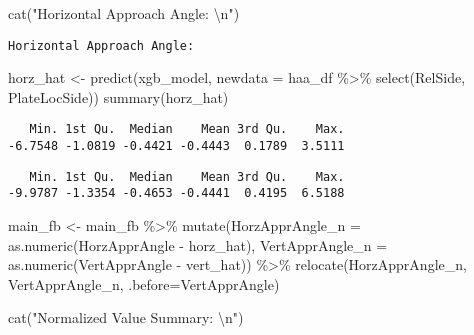 \documentclass[
  letterpaper,
  DIV=11,
  numbers=noendperiod]{scrartcl}
\newenvironment{Shaded}{\begin{snugshade}}{\end{snugshade}}
\newcommand{\AttributeTok}[1]{\textcolor[rgb]{0.40,0.45,0.13}{#1}}
\newcommand{\FunctionTok}[1]{\textcolor[rgb]{0.28,0.35,0.67}{#1}}
\newcommand{\NormalTok}[1]{\textcolor[rgb]{0.00,0.23,0.31}{#1}}
\newcommand{\OtherTok}[1]{\textcolor[rgb]{0.00,0.23,0.31}{#1}}
\newcommand{\SpecialCharTok}[1]{\textcolor[rgb]{0.37,0.37,0.37}{#1}}
\newcommand{\StringTok}[1]{\textcolor[rgb]{0.13,0.47,0.30}{#1}}
\begin{document}
\begin{Shaded}
\begin{Highlighting}[]
\FunctionTok{cat}\NormalTok{(}\StringTok{"Horizontal Approach Angle: }\SpecialCharTok{\textbackslash{}n}\StringTok{"}\NormalTok{)}
\end{Highlighting}
\end{Shaded}

\begin{verbatim}
Horizontal Approach Angle: 
\end{verbatim}

\begin{Shaded}
\begin{Highlighting}[]
\NormalTok{horz\_hat }\OtherTok{\textless{}{-}} \FunctionTok{predict}\NormalTok{(xgb\_model, }\AttributeTok{newdata =}\NormalTok{ haa\_df }\SpecialCharTok{\%\textgreater{}\%} \FunctionTok{select}\NormalTok{(RelSide, PlateLocSide))}
\FunctionTok{summary}\NormalTok{(horz\_hat)}
\end{Highlighting}
\end{Shaded}

\begin{verbatim}
   Min. 1st Qu.  Median    Mean 3rd Qu.    Max. 
-6.7548 -1.0819 -0.4421 -0.4443  0.1789  3.5111 
\end{verbatim}

\begin{Shaded}
\end{Shaded}

\begin{verbatim}
   Min. 1st Qu.  Median    Mean 3rd Qu.    Max. 
-9.9787 -1.3354 -0.4653 -0.4441  0.4195  6.5188 
\end{verbatim}

\begin{Shaded}
\begin{Highlighting}[]
\NormalTok{main\_fb }\OtherTok{\textless{}{-}}\NormalTok{ main\_fb }\SpecialCharTok{\%\textgreater{}\%}
  \FunctionTok{mutate}\NormalTok{(}\AttributeTok{HorzApprAngle\_n =} \FunctionTok{as.numeric}\NormalTok{(HorzApprAngle }\SpecialCharTok{{-}}\NormalTok{ horz\_hat),}
         \AttributeTok{VertApprAngle\_n =} \FunctionTok{as.numeric}\NormalTok{(VertApprAngle }\SpecialCharTok{{-}}\NormalTok{ vert\_hat)) }\SpecialCharTok{\%\textgreater{}\%}
  \FunctionTok{relocate}\NormalTok{(HorzApprAngle\_n, VertApprAngle\_n, }\AttributeTok{.before=}\NormalTok{VertApprAngle)}

\FunctionTok{cat}\NormalTok{(}\StringTok{"Normalized Value Summary: }\SpecialCharTok{\textbackslash{}n}\StringTok{"}\NormalTok{)}
\end{Highlighting}
\end{Shaded}
\end{document}
